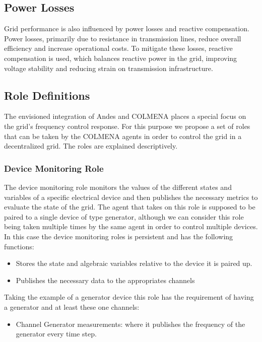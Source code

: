 \documentclass{article}
\begin{document}
\subsection*{Power Losses}

Grid performance is also influenced by power losses and reactive compensation. Power losses, primarily due to resistance in transmission lines, reduce overall efficiency and increase operational costs. To mitigate these losses, reactive compensation is used, which balances reactive power in the grid, improving voltage stability and reducing strain on transmission infrastructure. 


\subsection{Role Definitions}

The envisioned integration of Andes and COLMENA places a special focus on the grid's frequency control response. For this purpose we propose a set of roles that can be taken by the COLMENA agents in order to control the grid in a decentralized grid. The roles are explained descriptively.  

\subsubsection*{Device Monitoring Role}

The device monitoring role monitors the values of the different states and variables of a specific electrical device and then publishes the necessary metrics to evaluate the state of the grid. The agent that takes on this role is supposed to be paired to a single device of type generator, although we can consider this role being taken multiple times by the same agent in order to control multiple devices. In this case the device monitoring roles is persistent and has the following functions:

 \begin{itemize}
     \item Stores the state and algebraic variables relative to the device it is paired up.
     \item Publishes the necessary data to the appropriates channels
 \end{itemize}

Taking the example of a generator device this role has the requirement of having a generator and at least these one channels:

\begin{itemize}
    \item Channel Generator measurements: where it publishes the frequency of the generator every time step.
\end{itemize}
\end{document}

